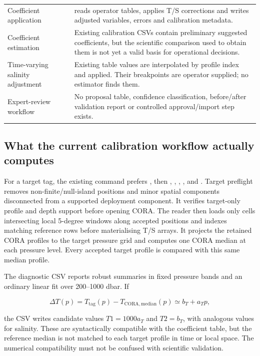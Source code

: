 \documentclass[11pt,a4paper]{article}
\newcommand{\done}{\textcolor{meopgreen}{\ding{51}}}
\newcommand{\partdone}{\textcolor{meopamber}{\ding{108}}}
\newcommand{\missing}{\textcolor{meopred}{\ding{55}}}
\newcommand{\pkg}[1]{\texttt{\detokenize{#1}}}
\begin{document}
\begin{longtable}{>{\raggedright\arraybackslash}p{} >{\centering\arraybackslash}p{} >{\raggedright\arraybackslash}p{}}
Coefficient application & \done & \pkg{processing/adjustments.py} reads operator tables, applies T/S corrections and writes adjusted variables, errors and calibration metadata. \\
Coefficient estimation & \partdone & Existing calibration CSVs contain preliminary suggested coefficients, but the scientific comparison used to obtain them is not yet a valid basis for operational decisions. \\
Time-varying salinity adjustment & \done & Existing table values are interpolated by profile index and applied. Their breakpoints are operator supplied; no estimator finds them. \\
Expert-review workflow & \missing & No proposal table, confidence classification, before/after validation report or controlled approval/import step exists. \\
\bottomrule
\end{longtable}

\subsection{What the current calibration workflow actually computes}

For a target tag, the existing command prefers \pkg{hr1}, then \pkg{lr1},
\pkg{hr2}, \pkg{hr0}, \pkg{lr0}, \pkg{fr1} and \pkg{fr0}. Target preflight removes
non-finite/null-island positions and minor spatial components disconnected from a
supported deployment component. It verifies target-only profile and depth support
before opening CORA. The reader then loads only cells intersecting local 5-degree
windows along accepted positions and indexes matching reference rows before
materialising T/S arrays. It projects the retained CORA profiles to the target pressure
grid and computes one CORA median at each pressure level. Every accepted target profile
is compared with this same median profile.

The diagnostic CSV reports robust summaries in fixed pressure bands and an ordinary
linear fit over 200--1000 dbar. If

\begin{equation}
\Delta T(p) = T_{\mathrm{tag}}(p)-T_{\mathrm{CORA,median}}(p)
             \simeq b_T + a_T p,
\end{equation}

the CSV writes candidate values \(T1=1000a_T\) and \(T2=b_T\), with analogous
values for salinity. These are syntactically compatible with the coefficient table,
but the reference median is not matched to each target profile in time or local space.
The numerical compatibility must not be confused with scientific validation.
\end{document}
